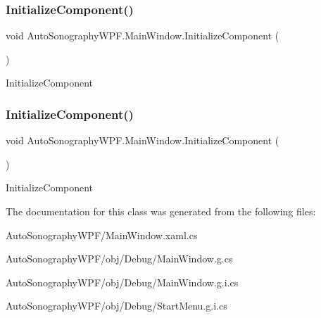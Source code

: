 \subsubsection{\texorpdfstring{Initialize\+Component()}{InitializeComponent()}\hspace{0.1cm}{\footnotesize\ttfamily [5/6]}}
{\footnotesize\ttfamily void Auto\+Sonography\+W\+P\+F.\+Main\+Window.\+Initialize\+Component (\begin{DoxyParamCaption}{ }\end{DoxyParamCaption})}



Initialize\+Component 

\hypertarget{class_auto_sonography_w_p_f_1_1_main_window_a78046a04c327527f4db402722f7aea35}{}\label{class_auto_sonography_w_p_f_1_1_main_window_a78046a04c327527f4db402722f7aea35} 
\subsubsection{\texorpdfstring{Initialize\+Component()}{InitializeComponent()}\hspace{0.1cm}{\footnotesize\ttfamily [6/6]}}
{\footnotesize\ttfamily void Auto\+Sonography\+W\+P\+F.\+Main\+Window.\+Initialize\+Component (\begin{DoxyParamCaption}{ }\end{DoxyParamCaption})}



Initialize\+Component 



The documentation for this class was generated from the following files\+:\begin{DoxyCompactItemize}
\item 
Auto\+Sonography\+W\+P\+F/Main\+Window.\+xaml.\+cs\item 
Auto\+Sonography\+W\+P\+F/obj/\+Debug/Main\+Window.\+g.\+cs\item 
Auto\+Sonography\+W\+P\+F/obj/\+Debug/Main\+Window.\+g.\+i.\+cs\item 
Auto\+Sonography\+W\+P\+F/obj/\+Debug/Start\+Menu.\+g.\+i.\+cs\end{DoxyCompactItemize}

